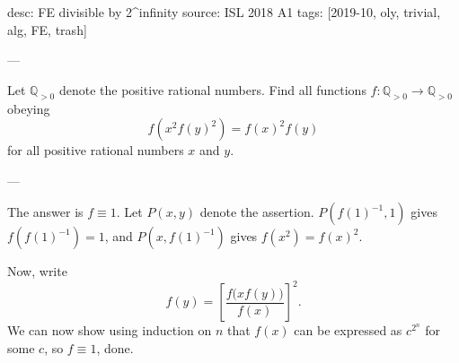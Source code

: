 desc: FE divisible by 2^infinity
source: ISL 2018 A1
tags: [2019-10, oly, trivial, alg, FE, trash]

---

Let $\mathbb Q_{>0}$ denote the positive rational numbers. Find all functions $f:\mathbb Q_{>0}\to\mathbb Q_{>0}$ obeying \[f\left(x^2f(y)^2\right)=f(x)^2f(y)\]
for all positive rational numbers $x$ and $y$.

---

The answer is $f\equiv 1$. Let $P(x,y)$ denote the assertion. $P(f(1)^{-1},1)$ gives $f(f(1)^{-1})=1$, and $P(x,f(1)^{-1})$ gives $f(x^2)=f(x)^2$.

Now, write \[f(y)=\left[\frac{f\big(xf(y)\big)}{f(x)}\right]^2.\]
We can now show using induction on $n$ that $f(x)$ can be expressed as $c^{2^n}$ for some $c$, so $f\equiv 1$, done.
